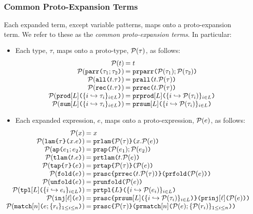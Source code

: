 \subsubsection{Common Proto-Expansion Terms}
Each expanded term, except variable patterns, maps onto a proto-expansion term. We refer to these as the \emph{common proto-expansion terms}. In particular:
\begin{itemize}
  \item Each type, $\tau$, maps onto a proto-type, $\mathcal{P}(\tau)$, as follows:
  \[\arraycolsep=1pt\begin{array}{rl}
  \Cof{t} & = t\\
  \Cof{\aparr{\tau_1}{\tau_2}} & = \aceparr{\Cof{\tau_1}}{\Cof{\tau_2}}\\
  \Cof{\aall{t}{\tau}} & = \aceall{t}{\Cof{\tau}}\\
  \Cof{\arec{t}{\tau}} & = \acerec{t}{\Cof{\tau}}\\
  \Cof{\aprod{\labelset}{\mapschema{\tau}{i}{\labelset}}} & = \aceprod{\labelset}{\mapschemax{\Cofv}{\tau}{i}{\labelset}}\\
  \Cof{\asum{\labelset}{\mapschema{\tau}{i}{\labelset}}} & = \acesum{\labelset}{\mapschemax{\Cofv}{\tau}{i}{\labelset}}
  \end{array}\]
  \item Each expanded expression, $e$, maps onto a proto-expression, $\mathcal{P}(e)$, as follows:
  \[\arraycolsep=1pt\hspace{-15px}\begin{array}{rl}
  \Cof{x} & = x\\
  \Cof{\aelam{\tau}{x}{e}} & = \acelam{\Cof{\tau}}{x}{\Cof{e}}\\
  \Cof{\aeap{e_1}{e_2}} & = \aceap{\Cof{e_1}}{\Cof{e_2}}\\
  \Cof{\aetlam{t}{e}} & = \acetlam{t}{\Cof{e}}\\
  \Cof{\aetap{e}{\tau}} & = \acetap{\Cof{e}}{\Cof{\tau}}\\
  \Cof{\aefold{e}} & = \aceasc{\acerec{t}{\Cof{\tau}}}{\acefold{\Cof e}}\\
  \Cof{\aeunfold{e}} & = \aceunfold{\Cof{e}}\\
  \Cof{\aetpl{\labelset}{\mapschema{e}{i}{\labelset}}} & = \acetpl{\labelset}{\mapschemax{\Cofv}{e}{i}{\labelset}}\\
  \Cof{\aein{\ell}{e}} &= \aceasc
    {
      \acesum{\labelset}{\mapschemax{\Cofv}{\tau}{i}{\labelset}}
    }{\acein{\ell}{\Cof{e}}}\\
  \Cof{\aematchwith{n}{e}{\seqschemaX{r}}} & = \aceasc{\Cof{\tau}}{\acematchwith{n}{\Cof{e}}{\seqschemaXx{\Cofv}{r}}}

\end{array}\]
\end{itemize}
